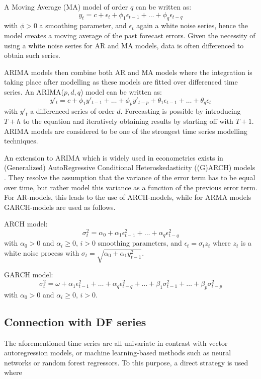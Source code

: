A Moving Average (MA) model of order $q$ can be written as:
\[y_t=c+\epsilon_t + \phi_1\epsilon_{t-1}+\dots + \phi_q\epsilon_{t-q}\]
with $\phi>0$ a smoothing parameter, and $\epsilon_t$ again a white noise series, hence the model creates a moving average of the past forecast errors.
Given the necessity of using a white noise series for AR and MA models, data is often differenced to obtain such series.

ARIMA models then combine both AR and MA models where the integration is taking place after modelling as these models are fitted over differenced time series. 
An ARIMA($p,d,q$) model can be written as:
\[y'_t=c + \phi_1 y'_{t-1} + \dots + \phi_p y'_{t-p} + \theta_1 \epsilon_{t-1} + \dots + \theta_q \epsilon_t\]
with $y'_t$ a differenced series of order $d$.
Forecasting is possible by introducing $T+h$ to the equation and iteratively obtaining results by starting off with $T+1$.
ARIMA models are considered to be one of the strongest time series modelling techniques.

An extension to ARIMA which is widely used in econometrics exists in (Generalized) AutoRegressive Conditional Heteroskedasticity ((G)ARCH) models \cite{francq2019garch}.
They resolve the assumption that the variance of the error term has to be equal over time, but rather model this variance as a function of the previous error term.
For AR-models, this leads to the use of ARCH-models, while for ARMA models GARCH-models are used as follows.

ARCH model:
\[\sigma^2_t = \alpha_0 + \alpha_1 \epsilon^2_{t-1} + \dots + \alpha_q \epsilon^2_{t-q}\]
with $\alpha_0 > 0$ and $\alpha_i\geq 0,\,i>0$ smoothing parameters, and $\epsilon_t = \sigma_tz_t$ where $z_t$ is a white noise process with $\sigma_t=\sqrt{\alpha_0+\alpha_1y^2_{t-1}}$.

GARCH model:
\[\sigma^2_t = \omega + \alpha_1 \epsilon^2_{t-1} + \dots + \alpha_q \epsilon^2_{t-q} + \dots + \beta_1\sigma^2_{t-1} + \dots + \beta_p\sigma^2_{t-p}\]
with $\alpha_0 > 0$ and $\alpha_i\geq 0,\,i>0$.



\subsection{Connection with DF series}
The aforementioned time series are all univariate in contrast with vector autoregression models, or machine learning-based methods such as neural networks or random forest regressors.
To this purpose, a direct strategy \cite{weigend2018time} is used where
